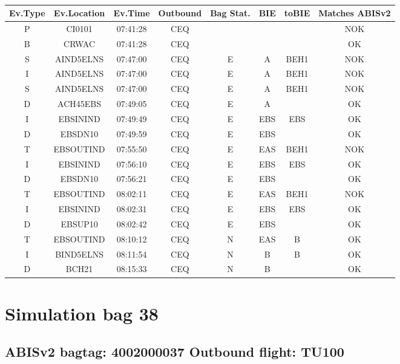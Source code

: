 \documentclass{report}
\begin{document}
\paragraph{}
\begin{longtable}{cccccccc}    \toprule
\rowcolor{white!50}
\textbf{Ev.Type} & \textbf{Ev.Location} & \textbf{Ev.Time} & \textbf{Outbound} & \textbf{Bag Stat.} & \textbf{BIE} & \textbf{toBIE} & \textbf{Matches ABISv2} \\\midrule
P & CI0101 & 07:41:28  & CEQ &  &  &  & NOK\\
B & CRWAC & 07:41:28  & CEQ &  &  &  & OK\\
S & AIND5ELNS & 07:47:00  & CEQ & E & A & BEH1 & NOK\\
I & AIND5ELNS & 07:47:00  & CEQ & E & A & BEH1 & NOK\\
S & AIND5ELNS & 07:47:00  & CEQ & E & A & BEH1 & NOK\\
D & ACH45EBS & 07:49:05  & CEQ & E & A &  & OK\\
I & EBSININD & 07:49:49  & CEQ & E & EBS & EBS & OK\\
D & EBSDN10 & 07:49:59  & CEQ & E & EBS &  & OK\\
T & EBSOUTIND & 07:55:50  & CEQ & E & EAS & BEH1 & NOK\\
I & EBSININD & 07:56:10  & CEQ & E & EBS & EBS & OK\\
D & EBSDN10 & 07:56:21  & CEQ & E & EBS &  & OK\\
T & EBSOUTIND & 08:02:11  & CEQ & E & EAS & BEH1 & NOK\\
I & EBSININD & 08:02:31  & CEQ & E & EBS & EBS & OK\\
D & EBSUP10 & 08:02:42  & CEQ & E & EBS &  & OK\\
T & EBSOUTIND & 08:10:12  & CEQ & N & EAS & B & OK\\
I & BIND5ELNS & 08:11:54  & CEQ & N & B & B & OK\\
D & BCH21 & 08:15:33  & CEQ & N & B &  & OK\\
\bottomrule
\end{longtable}
\pagebreak
\section*{Simulation bag 38}
\subsection*{ABISv2 bagtag: 4002000037 Outbound flight: TU100}
\end{document}
